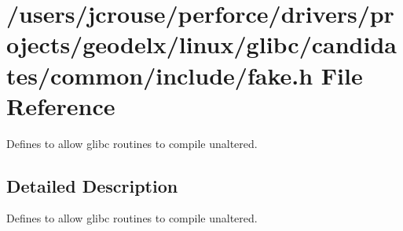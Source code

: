 \section{/users/jcrouse/perforce/drivers/projects/geodelx/linux/glibc/candidates/common/include/fake.h File Reference}
\label{fake_8h}
Defines to allow glibc routines to compile unaltered. 




\subsection{Detailed Description}
Defines to allow glibc routines to compile unaltered.



